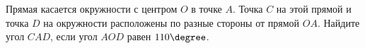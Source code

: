 \begin{ex}
	\begin{condition}
		Прямая касается окружности с центром \( O  \) в точке \( A \). Точка \( C  \) на этой прямой и точка \( D  \) на окружности расположены по разные стороны от прямой \( OA \). Найдите угол \( CAD \), если угол \( AOD  \) равен \( 110\degree \).
	\end{condition}
\end{ex}